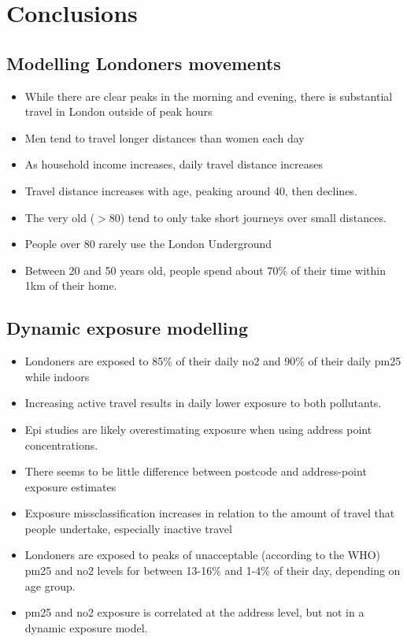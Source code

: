 \newpage
\section{Conclusions}
\label{sec:wrap_up_conclusions}

\subsection{Modelling Londoners movements}
\label{subsec:wrapup_conc_ltds}

\begin{itemize}
    \item While there are clear peaks in the morning and evening, there is substantial travel in London outside of peak hours
    \item Men tend to travel longer distances than women each day
    \item As household income increases, daily travel distance increases
    \item Travel distance increases with age, peaking around 40, then declines.
    \item The very old ($>$80) tend to only take short journeys over small distances.
    \item People over 80 rarely use the London Underground
    \item Between 20 and 50 years old, people spend about 70\% of their time within 1km of their home.
\end{itemize}

\subsection{Dynamic exposure modelling}
\label{subsec:wrapup_conc_exposure}

\begin{itemize}
    \item Londoners are exposed to 85\% of their daily \gls{no2} and 90\% of their daily \gls{pm25} while indoors
    \item Increasing active travel results in daily lower exposure to both pollutants.
    \item Epi studies are likely overestimating exposure when using address point concentrations.
    \item There seems to be little difference between postcode and address-point exposure estimates
    \item Exposure missclassification increases in relation to the amount of travel that people undertake, especially inactive travel
    \item Londoners are exposed to peaks of unacceptable (according to the WHO) \gls{pm25} and \gls{no2} levels for between 13-16\% and 1-4\% of their day, depending on age group.
    \item \gls{pm25} and \gls{no2} exposure is correlated at the address level, but not in a dynamic exposure model.
\end{itemize}

